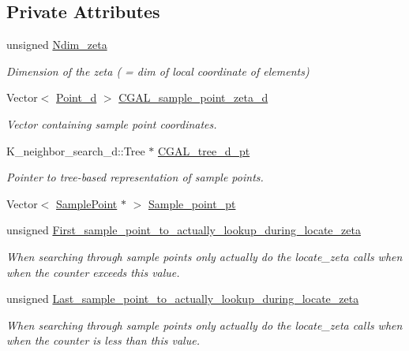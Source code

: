 \subsection*{Private Attributes}
\begin{DoxyCompactItemize}
\item 
unsigned \hyperlink{classCGALSamplePointContainer_abb1a9488b631a288360397b2587f69ea}{Ndim\+\_\+zeta}
\begin{DoxyCompactList}\small\item\em Dimension of the zeta ( = dim of local coordinate of elements) \end{DoxyCompactList}\item 
Vector$<$ \hyperlink{classCGALSamplePointContainer_a5cb9506ad72c5a21b91e626d5d8604ed}{Point\+\_\+d} $>$ \hyperlink{classCGALSamplePointContainer_aac09be4b101ee4a3c2f53a8d8edfd39d}{C\+G\+A\+L\+\_\+sample\+\_\+point\+\_\+zeta\+\_\+d}
\begin{DoxyCompactList}\small\item\em Vector containing sample point coordinates. \end{DoxyCompactList}\item 
K\+\_\+neighbor\+\_\+search\+\_\+d\+::\+Tree $\ast$ \hyperlink{classCGALSamplePointContainer_ab130a076d416e45522e4299acfe62afe}{C\+G\+A\+L\+\_\+tree\+\_\+d\+\_\+pt}
\begin{DoxyCompactList}\small\item\em Pointer to tree-\/based representation of sample points. \end{DoxyCompactList}\item 
Vector$<$ \hyperlink{classSamplePoint}{Sample\+Point} $\ast$ $>$ \hyperlink{classCGALSamplePointContainer_a806c0488f0d6920ca835e4f62dadd337}{Sample\+\_\+point\+\_\+pt}
\item 
unsigned \hyperlink{classCGALSamplePointContainer_aa9e316fd8168bb0f84da14a7d6eba0fa}{First\+\_\+sample\+\_\+point\+\_\+to\+\_\+actually\+\_\+lookup\+\_\+during\+\_\+locate\+\_\+zeta}
\begin{DoxyCompactList}\small\item\em When searching through sample points only actually do the locate\+\_\+zeta calls when when the counter exceeds this value. \end{DoxyCompactList}\item 
unsigned \hyperlink{classCGALSamplePointContainer_a7b327f7e217dd4989fd53c103d6dcce0}{Last\+\_\+sample\+\_\+point\+\_\+to\+\_\+actually\+\_\+lookup\+\_\+during\+\_\+locate\+\_\+zeta}
\begin{DoxyCompactList}\small\item\em When searching through sample points only actually do the locate\+\_\+zeta calls when when the counter is less than this value. \end{DoxyCompactList}\item 

\end{DoxyCompactItemize}
